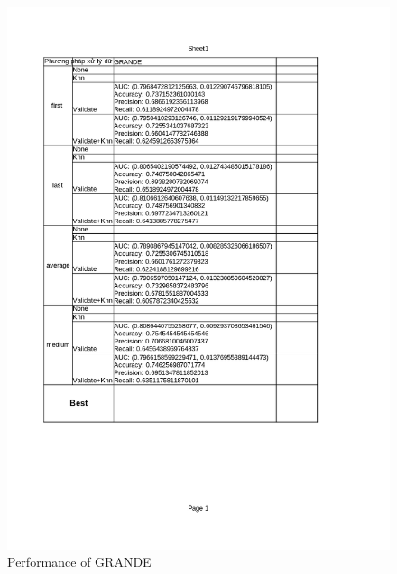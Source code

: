 \documentclass[../main.tex]{subfiles}
\begin{document}
 \begin{figure}[H]
    \centering
    \includegraphics[width=\textwidth]{Figure/KidneyResultLimit-new_GRANDE.png}
    \caption{Performance of GRANDE}
    \label{fig:KidneyResultLimit-new_GRANDE}
\end{figure}
\end{document}
